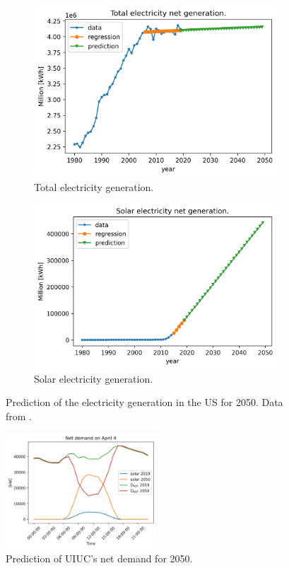 \documentclass[11pt,letterpaper]{article}
\begin{document}
	\begin{figure}[htbp!]
		\centering
		\begin{subfigure}[t]{0.4\textwidth}
			\centering
			\includegraphics[width=\linewidth]{figures/us-prediction1}
			\caption{Total electricity generation.}
		\end{subfigure}
		\begin{subfigure}[t]{0.4\textwidth}
			\centering
			\includegraphics[width=\linewidth]{figures/us-prediction2}
			\caption{Solar electricity generation.}
		\end{subfigure}
		\hfill
		\caption{Prediction of the electricity generation in the \gls{US} for 2050. Data from \cite{us_energy_information_administration_electric_2020}.}
		\label{fig:prediction}
	\end{figure}

	\begin{figure}[htbp!]
	    \centering
		\includegraphics[height=4.3cm]{figures/uiuc-duck}
		\hfill
		\caption{Prediction of \gls{UIUC}'s net demand for 2050.}
		\label{fig:uiuc-duck1}
	\end{figure}
\end{document}
